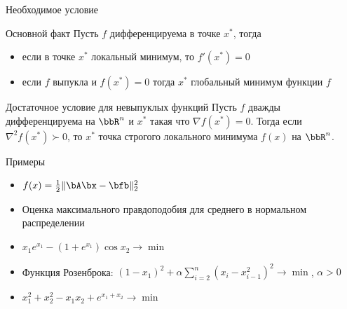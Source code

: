 \documentclass[12pt]{beamer}
\begin{document}
\begin{frame}{Необходимое условие}
\begin{block}{Основной факт}
Пусть $f$ дифференцируема в точке $x^*$, тогда
\begin{itemize}
\item если в точке $x^*$ локальный минимум, то $f'(x^*) = 0$
\item если $f$ выпукла и $f(x^*) = 0$ тогда $x^*$ глобальный минимум функции $f$
\end{itemize}
\end{block}

\begin{block}{Достаточное условие для невыпуклых функций}
Пусть $f$ дважды дифференцируема на $\bbR^n$ и $x^*$ такая что $\nabla f(x^*) = 0$. 
Тогда если $\nabla^2 f(x^*) \succ 0$, то $x^*$ точка строгого локального минимума $f(x)$ на $\bbR^n$.  
\end{block}

\end{frame}

\begin{frame}{Примеры}
\begin{itemize}[<+->]
\item $f(x) = \frac{1}{2}\|\bA\bx - \bfb\|_2^2$
\item Оценка максимального правдоподобия для среднего в нормальном распределении
\item $x_1e^{x_1} - (1 + e^{x_1})\cos x_2 \rightarrow \min$
\item Функция Розенброка: $(1 - x_1)^2 + \alpha \sum\limits_{i = 2}^n (x_i - x^2_{i-1})^2 \rightarrow \min$, $\alpha > 0$
\item $x^2_1 + x^2_2 - x_1x_2 + e^{x_1 + x_2} \rightarrow \min$
\end{itemize}
\end{frame}
\end{document}
